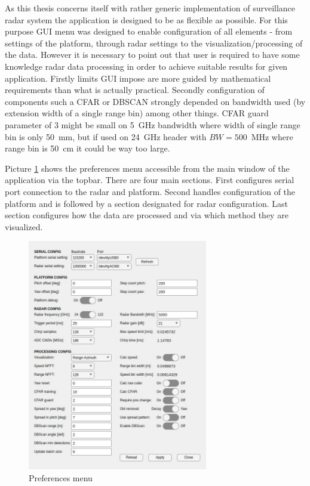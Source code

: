 As this thesis concerns itself with rather generic implementation of surveillance radar system the application is designed to be as flexible as possible.
For this purpose GUI menu was designed to enable configuration of all elements - from settings of the platform, through radar settings to the visualization/processing of the data.
However it is necessary to point out that user is required to have some knowledge radar data processing in order to achieve suitable results for given application.
Firstly limits GUI impose are more guided by mathematical requirements than what is actually practical.
Secondly configuration of components such a CFAR or DBSCAN strongly  depended on bandwidth used (by extension width of a single range bin) among other things.
CFAR guard parameter of 3 might be small on 5~GHz bandwidth where width of single range bin is only 50~mm, but if used on 24~GHz header with $BW=500$~MHz where range bin is 50~cm it could be way too large.

Picture \ref{fig:preferences} shows the preferences menu accessible from the main window of the application via the topbar.
There are four main sections.
First configures serial port connection to the radar and platform.
Second handles configuration of the platform and is followed by a section designated for radar configuration.
Last section configures how the data are processed and via which method they are visualized.

\begin{figure}[h!]
  \centering
  \includegraphics[width=0.7\textwidth]{../img/preferences.jpg}
  \caption[Preferences menu]{Preferences menu}
  \label{fig:preferences}
\end{figure}

